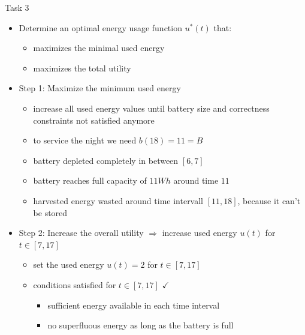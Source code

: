 \begin{frame}[allowframebreaks]{Task 3}{}
  \begin{tasknoinc}
    \begin{itemize}
       \item Determine an optimal energy usage function $u^*(t)$ that:
         \begin{itemize}
            \item \alert{maximizes} the minimal used energy
            \item \alert{maximizes} the total utility
         \end{itemize}
    \end{itemize}
  \end{tasknoinc}
  \framebreak
  \begin{solutionnoinc}
    \begin{itemize}
      \item \alert{Step 1:} Maximize the minimum used energy
      \begin{itemize}
        \item increase all used energy values until battery size and correctness constraints not satisfied anymore
        \item to service the night we need $b(18)=11=B$
        \item battery depleted completely in between $[6, 7]$
        \item battery reaches full capacity of $11Wh$ around time $11$
        \item harvested energy wasted around time intervall $[11, 18]$, because it can't be stored
      \end{itemize}
    \end{itemize}
  \end{solutionnoinc}
  \begin{solutionnoinc}
    \begin{itemize}
      \item \alert{Step 2:} Increase the overall utility $\Rightarrow$ increase used energy $u(t)$ for $t\in [7, 17]$
        \begin{itemize}
          \item set the used energy $u(t) = 2$ for $t\in[7, 17]$
          \item conditions satisfied for $t\in [7, 17]$ $\checkmark$
            \begin{itemize}
              \item sufficient energy available in each time interval
              \item no superfluous energy as long as the battery is full

\end{itemize}
\end{itemize}
\end{itemize}
\end{solutionnoinc}
\end{frame}
